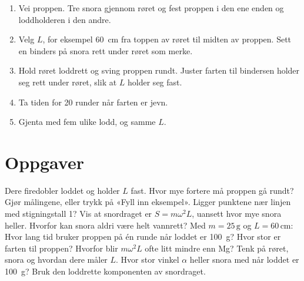 \documentclass[11pt]{article}
\begin{document}
\begin{enumerate}
\item Vei proppen. Tre snora gjennom røret og fest proppen i den ene enden og loddholderen i den andre.
\item Velg $L$, for eksempel 60~cm fra toppen av røret til midten av proppen. Sett en binders på snora rett under røret som merke.
\item Hold røret loddrett og sving proppen rundt. Juster farten til bindersen holder seg rett under røret, slik at $L$ holder seg fast.
\item Ta tiden for 20 runder når farten er jevn.
\item Gjenta med fem ulike lodd, og samme $L$.
\end{enumerate}

\section*{Oppgaver}

\begin{oppgaveliste}
\oppgave {}Dere firedobler loddet og holder $L$ fast. Hvor mye fortere må proppen gå rundt?
\svar
\oppgave {}Gjør målingene, eller trykk på «Fyll inn eksempel». Ligger punktene nær linjen med stigningstall 1?
\svar
\oppgave {}Vis at snordraget er $S = mω^{2}L$, uansett hvor mye snora heller. Hvorfor kan snora aldri være helt vannrett?
\svar
\oppgave {}Med $m = 25\,\mathrm{g}$ og $L = 60\,\mathrm{cm}$: Hvor lang tid bruker proppen på én runde når loddet er 100~g? Hvor stor er farten til proppen?
\svar
\oppgave {}Hvorfor blir $mω^{2}L$ ofte litt mindre enn Mg? Tenk på røret, snora og hvordan dere måler $L$.
\svar
\oppgave {}Hvor stor vinkel $α$ heller snora med når loddet er 100~g? Bruk den loddrette komponenten av snordraget.
\svar
\end{oppgaveliste}
\end{document}
